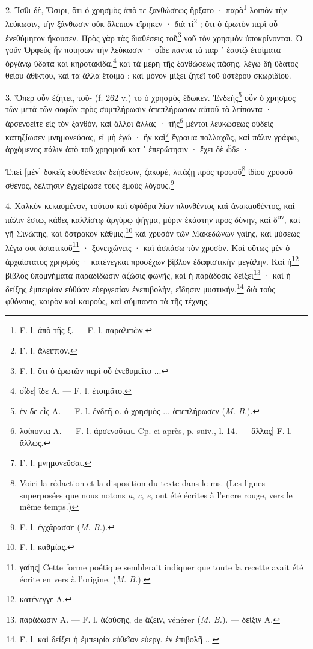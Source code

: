 \documentclass[a4paper, 11pt, oneside, polutonikogreek, french]{article}
\begin{document}
2. Ἴσθι δὲ, Ὄσιρι, ὅτι ὁ χρησμὸς ἀπὸ τε ξανθώσεως ἤρξατο · παρὰ\footnote{F. l. ἀπὸ τῆς ξ. --- F. l. παραλιπὼν.} λοιπὸν τὴν λεύκωσιν, τὴν ξάνθωσιν οὐκ ἄλειπον εἴρηκεν · διὰ τί\footnote{F. l. ἄλειπτον.} ; ὅτι ὁ ἐρωτὸν περὶ οὗ ἐνεθύμητον ἤκουσεν. Πρὸς γὰρ τὰς διαθέσεις τοῦ\footnote{F. l. ὅτι ὁ ἐρωτῶν περὶ οὗ ἐνεθυμεῖτο ...} νοῦ τὸν χρησμὸν ὑποκρίνονται. Ὁ γοῦν Ὀρφεὺς ἦν ποίησων τὴν λεύκωσιν · οἶδε πάντα τὰ παρ ᾽ ἑαυτῷ ἑτοίματα ὀργάνῳ ὕδατα καὶ κηροτακίδα,\footnote{οἶδε] ἴδε A. --- F. l. ἐτοιμᾶτο.} καὶ τὰ μέρη τῆς ξανθώσεως πάσης, λέγω δὴ ὕδατος θείου ἀθίκτου, καὶ τὰ ἄλλα ἔτοιμα : καὶ μόνον μίξει ζητεῖ τοῦ ὐστέρου σκωριδίου.

3. Ὅπερ οὖν ἐζήτει, τοῦ- (f. 262 v.) το ὁ χρησμὸς ἔδωκεν. Ἐνδεὴς\footnote{ἐν δε εἷς A. --- F. l. ἐνδεῆ ο. ὁ χρησμὸς ... ἀπεπλήρωσεν (\emph{M. B.}).} οὖν ὁ χρησμὸς τῶν μετὰ τῶν σοφῶν πρὸς συμπλήρωσιν ἀπεπλήρωσαν αὐτοῦ τὰ λείποντα · ἀρσενοείτε εἰς τὸν ξανθὸν, καὶ ἄλλοι ἄλλας · τῆς\footnote{λοίποντα A. --- F. l. ἀρσενοῦται. Cp. ci-après, p. suiv.,  l. 14. --- ἄλλας] F. l. ἄλλως.} μέντοι λευκώσεως οὐδεὶς κατηξίωσεν μνημονεύσας, εἰ μὴ ἐγώ · ἣν καὶ\footnote{F. l. μνημονεῦσαι.} ἔγραψα πολλαχῶς, καὶ πάλιν γράφω, ἀρχόμενος πάλιν ἀπὸ τοῦ χρησμοῦ κατ ᾽ ἐπερώτησιν · ἔχει δὲ ὧδε ·

Ἐπεὶ [μὲν] δοκεῖς εὐσθένεσιν δεήσεσιν, ζακορὲ, λιτάζῃ πρὸς τροφοῦ\footnote{Voici la rédaction et la disposition du texte dans le ms. (Les lignes superposées que nous notons \emph{a}, \emph{c}, \emph{e}, ont été écrites à l'encre rouge, vers le même temps.)  } ἰδίου χρυσοῦ σθένος, δέλτησιν ἐγχείρωσε τοὺς ἐμοὺς λόγους.\footnote{F. l. ἐγχάρασσε (\emph{M. B.}).}

4. Χαλκὸν κεκαυμένον, τούτου καὶ σφόδρα λίαν πλυνθέντος καὶ ἀνακαυθέντος, καὶ πάλιν ἔστω, κάθες καλλίστῳ ἀργύρῳ ψήγμα, μύριν ἑκάστην πρὸς δύνην, καὶ δ\textsuperscript{ον}, καὶ γῆ Σινώπης, καὶ ὄστρακον κάθμις,\footnote{F. l. καθμίας.} καὶ χρυσὸν τῶν Μακεδώνων γαίης, καὶ μύσεως λέγω σοι ἀσιατικοῦ\footnote{γαίης] Cette forme poétique semblerait indiquer que toute la recette avait été écrite en vers à l'origine. (\emph{M. B.}).} · ξυνειχώνεις · καὶ ἀσπάσω τὸν χρυσὸν. Καὶ οὕτως μὲν ὁ ἀρχαίοτατος χρησμός · κατένεγκαι προσέχων βίβλον ἐδαφιστικὴν μεγάλην. Καὶ ἡ\footnote{κατένεγγε A.} βίβλος ὑπομνήματα παραδίδωσιν ἀζώσις φωνῆς, καὶ ἡ παράδοσις δείξει\footnote{παράδωσιν A. --- F. l. ἁζούσης, de ἅζειν, vénérer (\emph{M. B.}). --- δείξιν A.} · καὶ ἡ δείξης ἐμπειρίαν εὐθύαν εὐεργεσίαν ἐνεπιβολὴν, εἴδησιν μυστικὴν,\footnote{F. l. καὶ δείξει ἡ ἐμπειρία εὐθεῖαν εὐεργ. ἐν ἐπιβολῇ ...} διὰ τοὺς φθόνους, καιρὸν καὶ καιροὺς, καὶ σύμπαντα τὰ τῆς τέχνης.
\end{document}
